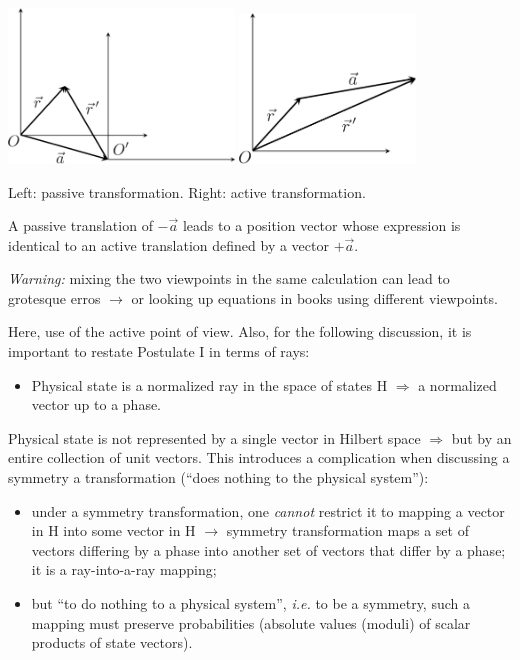 \documentclass[12pt]{article}
\begin{document}
\includegraphics[width=0.45\textwidth]{Figures/PassiveTransformation-crop.pdf}\hfill%
\includegraphics[width=0.35\textwidth]{Figures/ActiveTransformation-crop.pdf}\\
\begin{center}
Left: passive transformation. Right: active transformation.
\end{center}

A passive translation of \(-\vec{a}\) leads to a position
vector whose expression is identical to an active
translation defined by a vector \(+\vec{a}\).

\emph{Warning:}
mixing the two viewpoints in the
same calculation can lead to
grotesque erros $\rightarrow$
or looking up equations in
books using different viewpoints.

Here, use of the active point of view. Also, for
the following discussion, it is important to
restate Postulate I in terms of rays:
\begin{itemize}
\item Physical state is a normalized ray in the
space of states H \(\Rightarrow\) a normalized vector up
to a phase.
\end{itemize}


Physical state is not represented by a single vector
in Hilbert space \(\Rightarrow\) but by an entire collection of
unit vectors. This introduces a complication when
discussing a symmetry a transformation (``does nothing
to the physical system''):
\begin{itemize}
\item under a symmetry transformation, 
one \emph{cannot} restrict it to mapping a vector in
H into some vector in H
$\rightarrow$
symmetry transformation maps a set
of vectors differing by a phase into another
set of vectors that differ by a phase; it is
a ray-into-a-ray mapping;
%
\item
but ``to do nothing to a physical system'', \textit{i.e.} to
be a symmetry, such a mapping must preserve
probabilities (absolute values (moduli) of scalar
products of state vectors).
\end{itemize}
\end{document}
